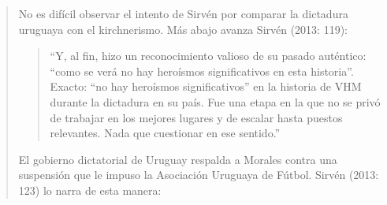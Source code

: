 \begin{quote}
No es difícil observar el intento de Sirvén por comparar la dictadura uruguaya con el kirchnerismo. Más abajo avanza Sirvén (2013: 119):

\begin{quote}
	\enquote{Y, al fin, hizo un reconocimiento valioso de su pasado auténtico: ``como se verá no hay heroísmos significativos en esta historia''. Exacto: ``no hay heroísmos significativos'' en la historia de VHM durante la dictadura en su país. Fue una etapa en la que no se privó de trabajar en los mejores lugares y de escalar hasta puestos relevantes. Nada que cuestionar en ese sentido.}
\end{quote}


El gobierno dictatorial de Uruguay respalda a Morales contra una suspensión que le impuso la Asociación Uruguaya de Fútbol. Sirvén (2013: 123) lo narra de esta manera:


\end{quote}
